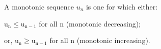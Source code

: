 A monotonic sequence $u_{n}$  is one for which either:
\par
 $ \mathrm{u}_{\mathrm{n}} \leq \mathrm{u}_{\mathrm{n}-1} $ for all n 
(monotonic decreasing);
\par
 or, $ \mathrm{u}_{\mathrm{n}} \geq \mathrm{u}_{\mathrm{n}-1} $ for all n
(monotonic increasing).